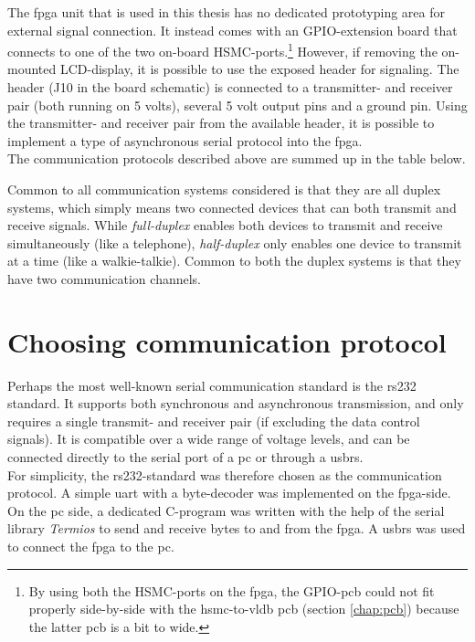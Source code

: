 \documentclass[main.tex]{subfiles}
\begin{document}
The \gls{fpga} unit that is used in this thesis has no dedicated prototyping area for external signal connection. It instead comes with an GPIO-extension board that connects to one of the two on-board HSMC-ports.\footnote{By using both the HSMC-ports on the \gls{fpga}, the GPIO-\gls{pcb} could not fit properly side-by-side with the \acrshort{hsmc}-to-\acrshort{vldb} \acrshort{pcb} (section \ref{chap:pcb}) because the latter \gls{pcb} is a bit to wide.} However, if removing the on-mounted LCD-display, it is possible to use the exposed header for signaling. The header (J10 in the board schematic) is connected to a transmitter- and receiver pair (both running on 5 volts), several 5 volt output pins and a ground pin. Using the transmitter- and receiver pair from the available header, it is possible to implement a type of asynchronous serial protocol into the \gls{fpga}.\\


The communication protocols described above are summed up in the table below.

Common to all communication systems considered is that they are all duplex systems, which simply means two connected devices that can both transmit and receive signals. While \textit{full-duplex} enables both devices to transmit and receive simultaneously (like a telephone), \textit{half-duplex} only enables one device to transmit at a time (like a walkie-talkie). Common to both the duplex systems is that they have two communication channels. 

\section{Choosing communication protocol}
Perhaps the most well-known serial communication standard is the \gls{rs232} standard. It supports both synchronous and asynchronous transmission, and only requires a single transmit- and receiver pair (if excluding the data control signals). It is compatible over a wide range of voltage levels, and can be connected directly to the serial port of a \gls{pc} or through a \gls{usbrs}. \\

For simplicity, the \acrshort{rs232}-standard was therefore chosen as the communication protocol. A simple \gls{uart} with a byte-decoder was implemented on the \gls{fpga}-side. On the \gls{pc} side, a dedicated C-program was written with the help of the serial library \textit{Termios} to send and receive bytes to and from the \gls{fpga}.  A \gls{usbrs} was used to connect the \gls{fpga} to the \gls{pc}. 
\end{document}
